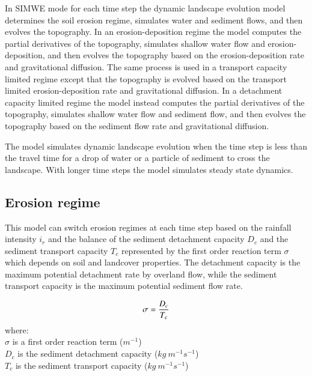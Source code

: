 \documentclass[final,3p,times,twocolumn]{elsarticle}
\begin{document}
In SIMWE mode 
for each time step
the dynamic landscape evolution model 
determines the soil erosion regime,
simulates water and sediment flows, 
and then evolves the topography. 
In an erosion-deposition regime 
the model 
computes the partial derivatives of the topography,
simulates shallow water flow and erosion-deposition,
and then evolves the topography based on the erosion-deposition rate
and gravitational diffusion.
The same process is used in
a transport capacity limited regime
except that the topography is evolved based on 
the transport limited erosion-deposition rate
and gravitational diffusion.
In a detachment capacity limited regime
the model instead
computes the partial derivatives of the topography,
simulates shallow water flow and sediment flow,
and then evolves the topography based on the sediment flow rate
and gravitational diffusion.

The model simulates dynamic landscape evolution 
when the time step is less than the travel time 
for a drop of water or a particle of sediment to cross the landscape.
With longer time steps the model simulates steady state dynamics. 

\subsection{Erosion regime}
This model can switch erosion regimes at each time step
based on the rainfall intensity $i_r$
and the balance of the sediment detachment capacity $D_c$
and the sediment transport capacity $T_c$
represented by the first order reaction term $\sigma$ 
which depends on soil and landcover properties.
The detachment capacity is the maximum potential detachment rate by overland flow, while
the sediment transport capacity is the maximum potential sediment flow rate.

\begin{equation}
\label{eq:regime}
\sigma = {D_c \over T_c}
\end{equation}
%
{\small
\noindent
where: \\
\noindent
\hspace*{0.5em} $\sigma$  is a first order reaction term ($m^{-1}$)\\
\hspace*{0.5em} $D_c$ is the sediment detachment capacity ($kg~m^{-1}s^{-1}$)\\
\hspace*{0.5em} $T_c$ is the sediment transport capacity ($kg~m^{-1}s^{-1}$)\\
}
\end{document}
